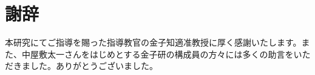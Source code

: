 \chapter*{謝辞}

本研究にてご指導を賜った指導教官の金子知適准教授に厚く感謝いたします。また、中屋敷太一さんをはじめとする金子研の構成員の方々には多くの助言をいただきました。ありがとうございました。